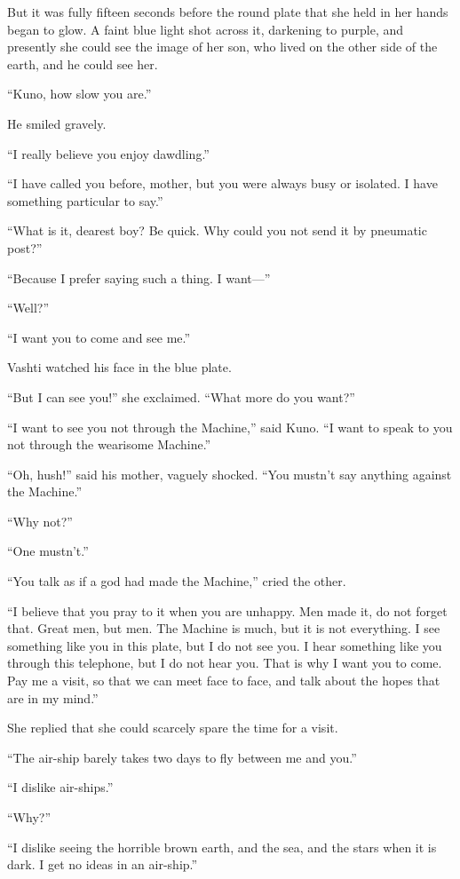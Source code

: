 But it was fully fifteen seconds before the round plate that she held in her hands began to glow. A faint blue light shot across it, darkening to purple, and presently she could see the image of her son, who lived on the other side of the earth, and he could see her.

``Kuno, how slow you are.''

He smiled gravely.

``I really believe you enjoy dawdling.''

``I have called you before, mother, but you were always busy or isolated. I have something particular to say.''

``What is it, dearest boy? Be quick. Why could you not send it by pneumatic post?''

``Because I prefer saying such a thing. I want---''

``Well?''

``I want you to come and see me.''

Vashti watched his face in the blue plate.

``But I can see you!'' she exclaimed. ``What more do you want?''

``I want to see you not through the Machine,'' said Kuno. ``I want to speak to you not through the wearisome Machine.''

``Oh, hush!'' said his mother, vaguely shocked. ``You mustn't say anything against the Machine.''

``Why not?''

``One mustn't.''

``You talk as if a god had made the Machine,'' cried the other.

``I believe that you pray to it when you are unhappy. Men made it, do not forget that. Great men, but men. The Machine is much, but it is not everything. I see something like you in this plate, but I do not see you. I hear something like you through this telephone, but I do not hear you. That is why I want you to come. Pay me a visit, so that we can meet face to face, and talk about the hopes that are in my mind.''

She replied that she could scarcely spare the time for a visit.

``The air-ship barely takes two days to fly between me and you.''

``I dislike air-ships.''

``Why?''

``I dislike seeing the horrible brown earth, and the sea, and the stars when it is dark. I get no ideas in an air-ship.''

